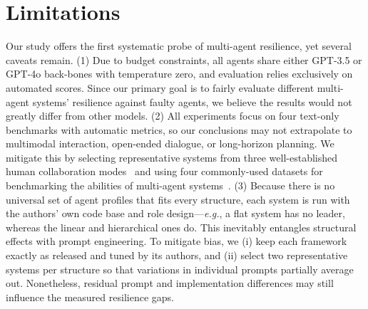 \documentclass{article}
\theoremstyle{plain}
\theoremstyle{definition}
\theoremstyle{remark}
\newcommand{\eg}{\textit{e.g.}}
\begin{document}
\section{Limitations}

Our study offers the first systematic probe of multi-agent resilience, yet several caveats remain.
(1) Due to budget constraints, all agents share either GPT-3.5 or GPT-4o back-bones with temperature zero, and evaluation relies exclusively on automated scores.
Since our primary goal is to fairly evaluate different multi-agent systems' resilience against faulty agents, we believe the results would not greatly differ from other models.
(2) All experiments focus on four text-only benchmarks with automatic metrics, so our conclusions may not extrapolate to multimodal interaction, open-ended dialogue, or long-horizon planning.
We mitigate this by selecting representative systems from three well-established human collaboration modes~\cite{yang2019communication, alexy2022flat, mihm2010hierarchical} and using four commonly-used datasets for benchmarking the abilities of multi-agent systems~\cite{liang2023encouraging, chen2021evaluating}.
(3) Because there is no universal set of agent profiles that fits every structure, each system is run with the authors' own code base and role design—\eg, a flat system has no leader, whereas the linear and hierarchical ones do.
This inevitably entangles structural effects with prompt engineering.
To mitigate bias, we (i) keep each framework exactly as released and tuned by its authors, and (ii) select two representative systems per structure so that variations in individual prompts partially average out.
Nonetheless, residual prompt and implementation differences may still influence the measured resilience gaps.

\end{document}
